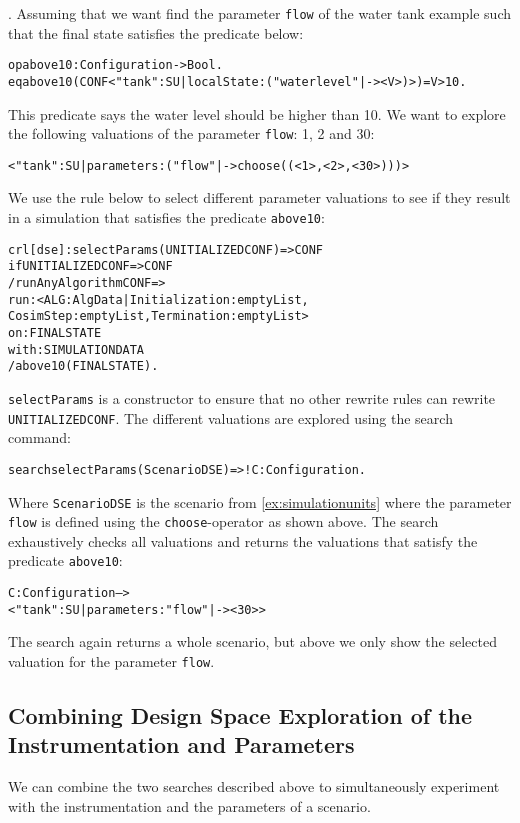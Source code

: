 \begin{example}\label{ex:dse}.
  Assuming that we want find the parameter \texttt{flow} of the water tank example such that the final state satisfies the predicate below:
  \scriptsize
  \begin{alltt}
op above10 : Configuration -> Bool .
eq above10(CONF < "tank" : SU | localState : ( "waterlevel" |-> < V >) >) = V > 10 .  
  \end{alltt}
  \normalsize
This predicate says the water level should be higher than 10.
We want to explore the following valuations of the parameter \texttt{flow}: 1, 2 and 30:
\small
\begin{alltt}
< "tank" : SU | parameters : ("flow" |-> choose((< 1 >,< 2 >,< 30 >))) >
\end{alltt}
\normalsize
We use the rule below to select different parameter valuations to see if they result in a simulation that satisfies the predicate \texttt{above10}:
\small
\begin{alltt}
  crl [dse] : selectParams(UNITIALIZEDCONF) => CONF 
  if UNITIALIZEDCONF => CONF
  / runAnyAlgorithm CONF => 
      run: < ALG : AlgData | Initialization : emptyList, 
      CosimStep : emptyList, Termination : emptyList > 
      on: FINALSTATE
      with: SIMULATIONDATA
  / above10(FINALSTATE) .
\end{alltt}
\normalsize
\texttt{selectParams} is a constructor to ensure that no other rewrite rules can rewrite \texttt{UNITIALIZEDCONF}.
The different valuations are explored using the search command:
\small
\begin{alltt}
  search selectParams(ScenarioDSE)  =>! C:Configuration .
\end{alltt}
\normalsize
Where \texttt{ScenarioDSE} is the scenario from \cref{ex:simulationunits} where the parameter \texttt{flow} is defined using the \texttt{choose}-operator as shown above.
The search exhaustively checks all valuations and returns the valuations that satisfy the predicate \texttt{above10}:
\small
\begin{alltt}
C:Configuration --> 
  < "tank" : SU | parameters : "flow" |-> < 30 > >
\end{alltt}
\normalsize
The search again returns a whole scenario, but above we only show the selected valuation for the parameter \texttt{flow}.
\end{example}

\subsection{Combining Design Space Exploration of the Instrumentation and Parameters}
We can combine the two searches described above to simultaneously  experiment with the instrumentation and the parameters of a scenario.

